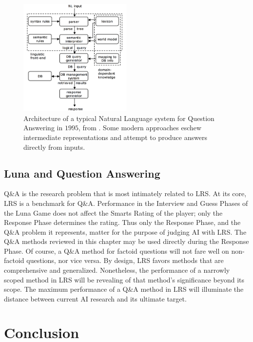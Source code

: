 \begin{figure}[h]
\centerline{%
\includegraphics[width=0.5\textwidth]{figures/NLPQA.png}}%
\caption{Architecture of a typical Natural Language system for Question Answering in $1995$, from \citep{androutsopoulos1995natural}. Some modern approaches eschew intermediate representations and attempt to produce answers directly from inputs.}
\label{fig:NLPQA}
\end{figure}


\subsection{Luna and Question Answering}

Q\&A is the research problem that is most intimately related to LRS. At its core, LRS is a benchmark for Q\&A. Performance in the Interview and Guess Phases of the Luna Game does not affect the Smarts Rating of the player; only the Response Phase determines the rating. Thus only the Response Phase, and the Q\&A problem it represents, matter for the purpose of judging AI with LRS. The Q\&A methods reviewed in this chapter may be used directly during the Response Phase. Of course, a Q\&A method for factoid questions will not fare well on non-factoid questions, nor vice versa. By design, LRS favors methods that are comprehensive and generalized. Nonetheless, the performance of a narrowly scoped method in LRS will be revealing of that method's significance beyond its scope. The maximum performance of a Q\&A method in LRS will illuminate the distance between current AI research and its ultimate target.



\section{Conclusion}

